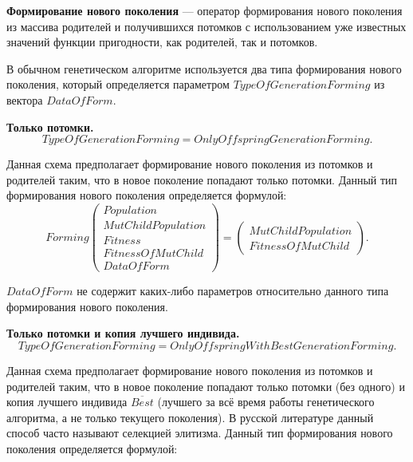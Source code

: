 \textbf{Формирование нового поколения} --- оператор формирования нового поколения из массива родителей и получившихся потомков с использованием уже известных значений функции пригодности, как родителей, так и потомков.

В обычном генетическом алгоритме используется два типа формирования нового поколения, который определяется параметром $ TypeOfGenerationForming $ из вектора $ DataOfForm $.

\textbf{Только потомки.}
\begin{equation}
\label{StandardGA:eq:OnlyOffspringGenerationForming}
TypeOfGenerationForming=OnlyOffspringGenerationForming.
\end{equation}

Данная схема предполагает формирование нового поколения из потомков и родителей таким, что в новое поколение попадают только потомки. Данный тип формирования нового поколения определяется формулой:
\begin{equation}
\label{StandardGA:eq:OnlyOffspringGenerationForming2}
Forming \left( \begin{array}{c} Population\\MutChildPopulation\\Fitness\\FitnessOfMutChild\\DataOfForm\end{array}\right) =\left( \begin{array}{c} MutChildPopulation\\FitnessOfMutChild\end{array}\right).
\end{equation}

$ DataOfForm $ не содержит каких-либо параметров относительно данного типа формирования нового поколения.

\textbf{Только потомки и копия лучшего индивида.}
\begin{equation}
\label{StandardGA:eq:OnlyOffspringWithBestGenerationForming}
TypeOfGenerationForming=OnlyOffspringWithBestGenerationForming.
\end{equation}

Данная схема предполагает формирование нового поколения из потомков и родителей таким, что в новое поколение попадают только потомки (без одного) и копия лучшего индивида $ \overline{Best} $ (лучшего за всё время работы генетического алгоритма, а не только текущего поколения). В русской литературе данный способ часто называют селекцией элитизма. Данный тип формирования нового поколения определяется формулой:

